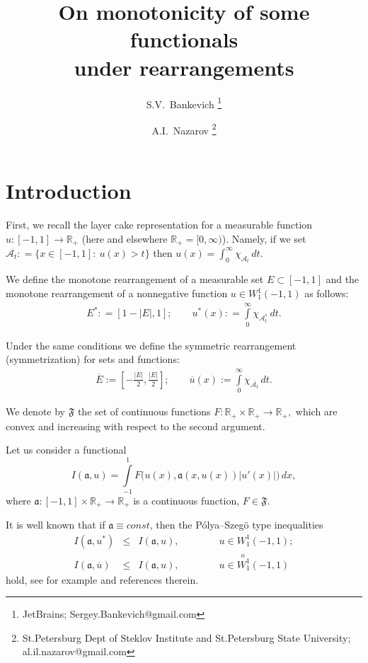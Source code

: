 \documentclass[12pt]{article}
\newcommand{\Real}{\mathbb R}
\newcommand{\abs}[1]{\left\vert#1\right\vert}
\renewcommand{\le}{\leqslant}
\newcommand{\Wf}{\stackrel{o\ }{W_1^1}}
\newcommand{\W}{W_1^1}
\begin{document}
\title{On monotonicity of some functionals \\ under rearrangements}
\author{
S.V.~Bankevich
\footnote{JetBrains; Sergey.Bankevich@gmail.com}
\and
A.I.~Nazarov
\footnote{St.Petersburg Dept of Steklov Institute and St.Petersburg State University; al.il.nazarov@gmail.com}
}

\maketitle

\section{Introduction}

First, we recall the layer cake representation for a measurable function $u: [-1, 1] \to \Real_+$
(here and elsewhere $\Real_+ = [0,\infty)$).
Namely, if we set $\mathcal{A}_t: = \{x \in [-1,1]:\ u(x)> t \}$
then $u(x) = \int_0^\infty \chi_{\mathcal{A}_t} \, dt$.

We define the monotone rearrangement of a measurable set $E \subset [-1, 1]$ and the
monotone rearrangement of a nonnegative function $u \in \W (-1, 1)$ as follows:
\begin{eqnarray*}
E^*: = [1 - \abs{E}, 1]; \qquad
u^*(x): = \int\limits_0^\infty \chi_{\mathcal{A}_t^*} \, dt.
\end{eqnarray*}

Under the same conditions we define the symmetric rearrangement 
(symmetrization) for sets and functions:
\begin{eqnarray*}
\overline{E} := [-\frac{\abs{E}}{2}, \frac{\abs{E}}{2}]; \qquad
\overline{u}(x) := \int\limits_0^\infty \chi_{\overline{\mathcal{A}_t}} \, dt.
\end{eqnarray*}

We denote by $\mathfrak{F}$ the set of continuous functions 
$F: \Real_+ \times \Real_+ \to \Real_+,$
which are convex and increasing with respect to the second argument.

Let us consider a functional
\begin{equation}
\label{functional}
I(\mathfrak a, u) = \int\limits_{-1}^1 F\big(u(x), \mathfrak a(x, u(x)) \abs{u'(x)}\big) \, dx,
\end{equation}
where $\mathfrak a: [-1, 1] \times \Real_+ \to \Real_+$ is a continuous function, $F \in \mathfrak{F}$.

It is well known that if $\mathfrak a \equiv const$, then the P\'olya--Szeg\"o type inequalities
\begin{eqnarray}
\label{toprove}
I(\mathfrak a, u^*) & \le & I(\mathfrak a, u), \qquad \qquad u \in \W(-1, 1);\\
\label{toproveSymm}
I(\mathfrak a, \overline{u}) & \le & I(\mathfrak a, u), \qquad \qquad u \in \Wf(-1, 1)
\end{eqnarray}
hold, see for example \cite{Kawohl} and references therein.
\end{document}
